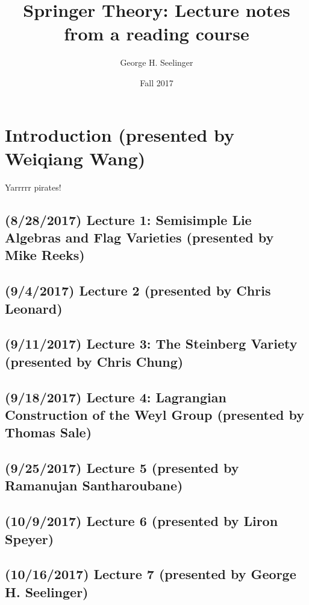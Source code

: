 \documentclass[11pt,leqno,oneside]{amsbook}
\title[Springer Theory]{Springer Theory: Lecture notes from a reading course}
\author{George H. Seelinger}
\date{Fall 2017}
\numberwithin{thm}{section}
\begin{document}
\maketitle
\pagebreak
\section{Introduction (presented by Weiqiang Wang)}
Yarrrrr pirates!
\subsection*{(8/28/2017) Lecture 1: Semisimple Lie Algebras and Flag Varieties (presented by Mike
  Reeks)}

\subsection*{(9/4/2017) Lecture 2 (presented by Chris Leonard)}

\subsection*{(9/11/2017) Lecture 3: The Steinberg Variety (presented
  by Chris Chung)}

\subsection*{(9/18/2017) Lecture 4: Lagrangian Construction of the
  Weyl Group (presented by Thomas Sale)}

\subsection*{(9/25/2017) Lecture 5 (presented by Ramanujan
  Santharoubane)}
\subsection*{(10/9/2017) Lecture 6 (presented by Liron Speyer)}
\subsection*{(10/16/2017) Lecture 7 (presented by George H. Seelinger)}
\begin{bibdiv}
  \begin{biblist}
  \end{biblist}
\end{bibdiv}
\end{document}
